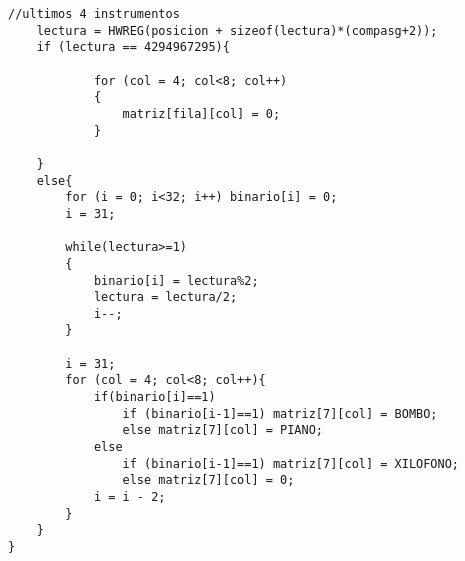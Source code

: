 \documentclass[12pt,a4paper]{article}
\begin{document}
\begin{lstlisting}[basicstyle=\footnotesize]
    //ultimos 4 instrumentos
    lectura = HWREG(posicion + sizeof(lectura)*(compasg+2));
    if (lectura == 4294967295){

            for (col = 4; col<8; col++)
            {
                matriz[fila][col] = 0;
            }

    }
    else{
        for (i = 0; i<32; i++) binario[i] = 0;
        i = 31;

        while(lectura>=1)
        {
            binario[i] = lectura%2;
            lectura = lectura/2;
            i--;
        }

        i = 31;
        for (col = 4; col<8; col++){
            if(binario[i]==1)
                if (binario[i-1]==1) matriz[7][col] = BOMBO;
                else matriz[7][col] = PIANO;
            else
                if (binario[i-1]==1) matriz[7][col] = XILOFONO;
                else matriz[7][col] = 0;
            i = i - 2;
        }
    }
}
\end{lstlisting}
\end{document}
